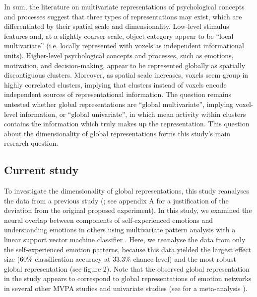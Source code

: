 \documentclass[jou,12pt,a4paper]{apa6}
\begin{document}
In sum, the literature on multivariate representations of psychological concepts and processes suggest that three types of representations may exist, which are differentiated by their spatial scale and dimensionality. Low-level stimulus features and, at a slightly coarser scale, object category appear to be ``local multivariate'' (i.e. locally represented with voxels as independent informational units). Higher-level psychological concepts and processes, such as emotions, motivation, and decision-making, appear to be represented globally as spatially discontiguous clusters. Moreover, as spatial scale increases, voxels seem group in highly correlated clusters, implying that clusters instead of voxels encode independent sources of representational information. The question remains untested whether global representations are ``global multivariate'', implying voxel-level information, or ``global univariate'', in which mean activity within clusters contains the information which truly makes up the representation. This question about the dimensionality of global representations forms this study's main research question. 

\subsection{Current study}
To investigate the dimensionality of global representations, this study reanalyses the data from a previous study (; see appendix A for a justification of the deviation from the original proposed experiment). In this study, we examined the neural overlap between components of self-experienced emotions and understanding emotions in others using multivariate pattern analysis with a linear support vector machine classifier \cite{chang2011}. Here, we reanalyse the data from only the self-experienced emotion patterns, because this data yielded the largest effect size (60\% classification accuracy at 33.3\% chance level) and the most robust global representation (see figure 2). Note that the observed global representation in the  study appears to correspond to global representations of emotion networks in several other MVPA studies \cite{kassam2013,saarimaki2015,kragel2015} and univariate studies (see for a meta-analysis ).
\end{document}
